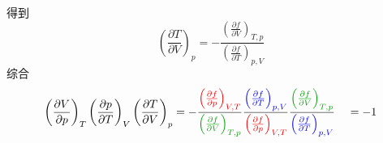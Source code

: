 得到
\begin{equation}
\left( \frac{\partial T}{\partial V} \right) _p=-\frac{\left( \frac{\partial f}{\partial V} \right) _{T,p}}{\left( \frac{\partial f}{\partial T} \right) _{p,V}}
\end{equation}
综合
\begin{equation}
\begin{aligned}
\left( \frac{\partial V}{\partial p} \right) _T\left( \frac{\partial p}{\partial T} \right) _V\left( \frac{\partial T}{\partial V} \right) _p&=-\frac{{\color[RGB]{240, 0, 0} \left( \frac{\partial f}{\partial p} \right) _{V,T}}}{{\color[RGB]{0, 160, 0} \left( \frac{\partial f}{\partial V} \right) _{T,p}}}\frac{{\color[RGB]{0, 0, 240} \left( \frac{\partial f}{\partial T} \right) _{p,V}}}{{\color[RGB]{240, 0, 0} \left( \frac{\partial f}{\partial p} \right) _{V,T}}}\frac{{\color[RGB]{0, 160, 0} \left( \frac{\partial f}{\partial V} \right) _{T,p}}}{{\color[RGB]{0, 0, 240} \left( \frac{\partial f}{\partial T} \right) _{p,V}}}
\
&=-1
\end{aligned}
\end{equation}

\newpage
